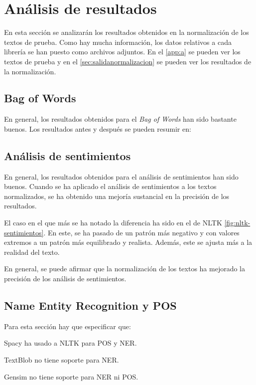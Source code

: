 \documentclass[a4paper,twocolumn]{article}
\begin{document}
    \section{Análisis de resultados}\label{sec:analisis-de-resultados}
    En esta sección se analizarán los resultados obtenidos en la normalización de los textos de prueba.
    Como hay mucha información, los datos relativos a cada librería se han puesto como archivos adjuntos.
    En el \autoref{app:a} se pueden ver los textos de prueba y en el \autoref{sec:salidanormalizacion} se pueden ver los resultados de la normalización.

    \subsection{Bag of Words}\label{subsec:bow}
    En general, los resultados obtenidos para el \textit{Bag of Words} han sido bastante buenos.
    Los resultados antes y después se pueden resumir en:

    \subsection{Análisis de sentimientos}\label{subsec:sentimientos}
    En general, los resultados obtenidos para el análisis de sentimientos han sido buenos.
    Cuando se ha aplicado el análisis de sentimientos a los textos normalizados, se ha obtenido una mejoría sustancial en la precisión de los resultados.

    El caso en el que más se ha notado la diferencia ha sido en el de NLTK \autoref{fig:nltk-sentimientos}.
    En este, se ha pasado de un patrón más negativo y con valores extremos a un patrón más equilibrado y realista.
    Además, este se ajusta más a la realidad del texto.

    En general, se puede afirmar que la normalización de los textos ha mejorado la precisión de los análisis de sentimientos.


    \subsection{Name Entity Recognition y POS}\label{subsec:ner-pos}
    Para esta sección hay que especificar que:
    \itemize
    {
    \item Spacy ha usado a NLTK para POS y NER.
    \item TextBlob no tiene soporte para NER.
    \item Gensim no tiene soporte para NER ni POS.
    }
\end{document}
